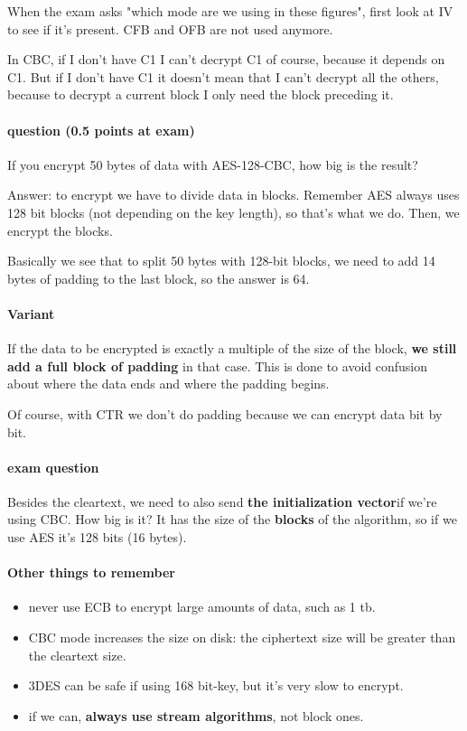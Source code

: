When the exam asks "which mode are we using in these figures", first look at IV to see if it's present. CFB and OFB are not used anymore.

In CBC, if I don't have C1 I can't decrypt C1 of course, because it depends on C1. But if I don't have C1 it doesn't mean that I can't decrypt all the others, because to decrypt a current block I only need the block preceding it.

\paragraph{question (0.5 points at exam)}
If you encrypt 50 bytes of data with AES-128-CBC, how big is the result?

Answer: to encrypt we have to divide data in blocks. Remember AES always uses 128 bit blocks (not depending on the key length), so that's what we do. Then, we encrypt the blocks.

Basically we see that to split 50 bytes with 128-bit blocks, we need to add 14 bytes of padding to the last block, so the answer is 64.

\paragraph{Variant}
If the data to be encrypted is exactly a multiple of the size of the block, \textbf{we still add a full block of padding} in that case. This is done to avoid confusion about where the data ends and where the padding begins.

Of course, with CTR we don't do padding because we can encrypt data bit by bit.

\paragraph{exam question}
Besides the cleartext, we need to also send \textbf{the initialization vector}if we're using CBC. How big is it? It has the size of the \textbf{blocks} of the algorithm, so if we use AES it's 128 bits (16 bytes).

\paragraph{Other things to remember}
\begin{itemize}
    \item never use ECB to encrypt large amounts of data, such as 1 tb.
    \item CBC mode increases the size on disk: the ciphertext size will be greater than the cleartext size.
    \item 3DES can be safe if using 168 bit-key, but it's very slow to encrypt.
    \item if we can, \textbf{always use stream algorithms}, not block ones.
\end{itemize}

